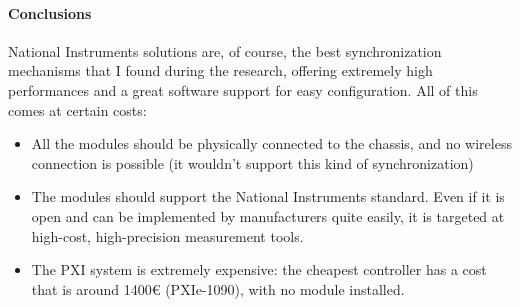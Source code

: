 \paragraph{Conclusions} National Instruments solutions are, of course, the best synchronization mechanisms that I found during the research, offering extremely high performances and a great software support for easy configuration. All of this comes at certain costs: 
\begin{itemize}
    \item All the modules should be physically connected to the chassis, and no wireless connection is possible (it wouldn't support this kind of synchronization)
    \item The modules should support the National Instruments standard. Even if it is open and can be implemented by manufacturers quite easily, it is targeted at high-cost, high-precision measurement tools.
    \item The PXI system is extremely expensive: the cheapest controller has a cost that is around 1400€ (PXIe-1090), with no module installed. 
\end{itemize} 